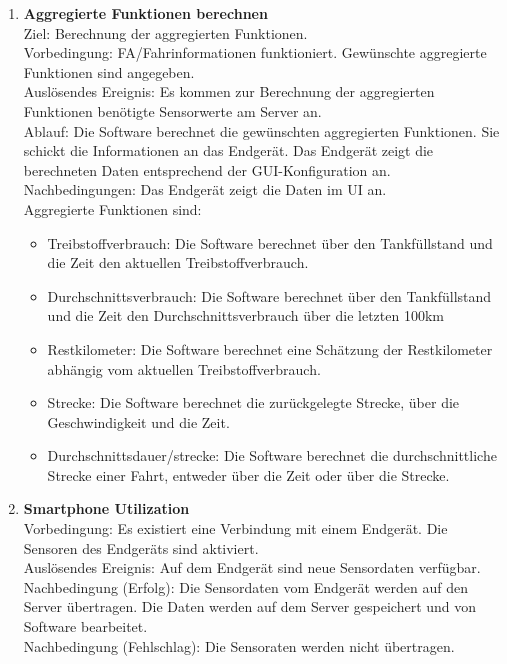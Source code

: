 \documentclass[pflichtenheft.tex]{subfiles}
\begin{document}
\begin{enumerate}
	\item{\textbf{Aggregierte Funktionen berechnen}} \\ Ziel: Berechnung der aggregierten Funktionen. \\ Vorbedingung: FA/Fahrinformationen funktioniert. Gewünschte aggregierte Funktionen sind angegeben. \\ Auslösendes Ereignis: Es kommen zur Berechnung der aggregierten Funktionen benötigte Sensorwerte am Server an. \\ Ablauf: Die Software berechnet die gewünschten aggregierten Funktionen. Sie schickt die Informationen an das Endgerät. Das Endgerät zeigt die berechneten Daten entsprechend der GUI-Konfiguration an. \\ Nachbedingungen: Das Endgerät zeigt die Daten im UI an.  \\ Aggregierte Funktionen sind:
		\begin{itemize}
			\item Treibstoffverbrauch: Die Software berechnet über den Tankfüllstand und die Zeit den aktuellen Treibstoffverbrauch.
			\item Durchschnittsverbrauch: Die Software berechnet über den Tankfüllstand und die Zeit den Durchschnittsverbrauch über die letzten 100km
			\item Restkilometer: Die Software berechnet eine Schätzung der Restkilometer abhängig vom aktuellen Treibstoffverbrauch.
			\item Strecke: Die Software berechnet die zurückgelegte Strecke, über die Geschwindigkeit und die Zeit.
			\item Durchschnittsdauer/strecke: Die Software berechnet die durchschnittliche Strecke einer Fahrt, entweder über die Zeit oder über die Strecke.
		\end{itemize}

	\item{\textbf{Smartphone Utilization}}\\ Vorbedingung: Es existiert eine Verbindung mit einem Endgerät. Die Sensoren des Endgeräts sind aktiviert.\\ Auslösendes Ereignis: Auf dem Endgerät sind neue Sensordaten verfügbar. \\ Nachbedingung (Erfolg): Die Sensordaten vom Endgerät werden auf den Server übertragen. Die Daten werden auf dem Server gespeichert und von Software bearbeitet.\\  Nachbedingung (Fehlschlag): Die Sensoraten werden nicht übertragen. \\


\end{enumerate}
\end{document}
